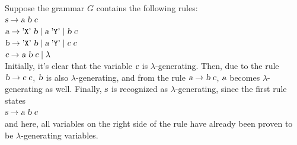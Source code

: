 \exampleEng
Suppose the grammar \(G\)
contains the following rules:
\\[0.2cm]
\hspace*{1.3cm}
\(\textsl{s} \rightarrow \textsl{a} \; \textsl{b} \; \textsl{c}\)
\\[0.2cm]
\hspace*{1.3cm}
\(\textsl{a} \rightarrow \mbox{'\texttt{X}'}\; \textsl{b} \mid \textsl{a} \;\mbox{'\texttt{Y}'} \mid \textsl{b}\;\textsl{c}\)
\\[0.2cm]
\hspace*{1.3cm}
\(\textsl{b} \rightarrow \mbox{'\texttt{X}'}\; \textsl{b} \mid \textsl{a} \;\mbox{'\texttt{Y}'} \mid \textsl{c}\;\textsl{c}\)
\\[0.2cm]
\hspace*{1.3cm}
\(\textsl{c} \rightarrow \textsl{a}\;\textsl{b}\; \textsl{c} \mid \lambda\)
\\[0.2cm]
Initially, it's clear that the variable \(\textsl{c}\) is \(\lambda\)-generating. Then, due to the rule
\(\textsl{b} \rightarrow \textsl{c} \;\textsl{c}\), \(\textsl{b}\) is also \(\lambda\)-generating, and from the rule \(\textsl{a} \rightarrow \textsl{b}\;\textsl{c}\), \(\textsl{a}\) 
becomes \(\lambda\)-generating as well. Finally, \(\textsl{s}\) is recognized as \(\lambda\)-generating,
since the first rule states
\\[0.2cm]
\hspace*{1.3cm}
\(\textsl{s} \rightarrow \textsl{a} \; \textsl{b} \; \textsl{c}\)
\\[0.2cm]
and here, all variables on the right side of the rule have already been proven to be
\(\lambda\)-generating variables. \eox


